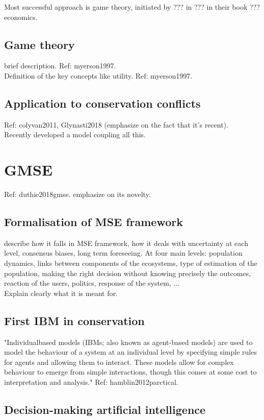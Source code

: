 \documentclass[12pt,a4paper]{article}
\begin{document}
Most successful approach is game theory, initiated by ??? in ??? in their book ??? economics.

\subsection{Game theory}
brief description. Ref: myerson1997.\\
Definition of the key concepts like utility. Ref: myerson1997.

\subsection{Application to conservation conflicts}
Ref: colyvan2011, Glynasti2018 (emphasize on the fact that it's recent).\\

Recently developed a model coupling all this.
\section{GMSE} Ref: duthie2018gmse. emphasize on its novelty.

\subsection{Formalisation of MSE framework}

describe how it falls in MSE framework, how it deals with uncertainty at each level, consensus biases, long term foreseeing.
At four main levels: population dynamics, links between components of the ecosystems, type of estimation of the population, making the right decision without knowing precisely the outcomes, reaction of the users, politics, response of the system, ...\\
Explain clearly what it is meant for.

\subsection{First IBM in conservation}

"Individualbased
models (IBMs; also known as agent-based models) are
used to model the behaviour of a system at an individual level
by specifying simple rules for agents and allowing them to
interact. These models allow for complex behaviour to emerge
from simple interactions, though this comes at some cost to
interpretation and analysis." Ref: hamblin2012parctical.

\subsection{Decision-making artificial intelligence}
\end{document}
